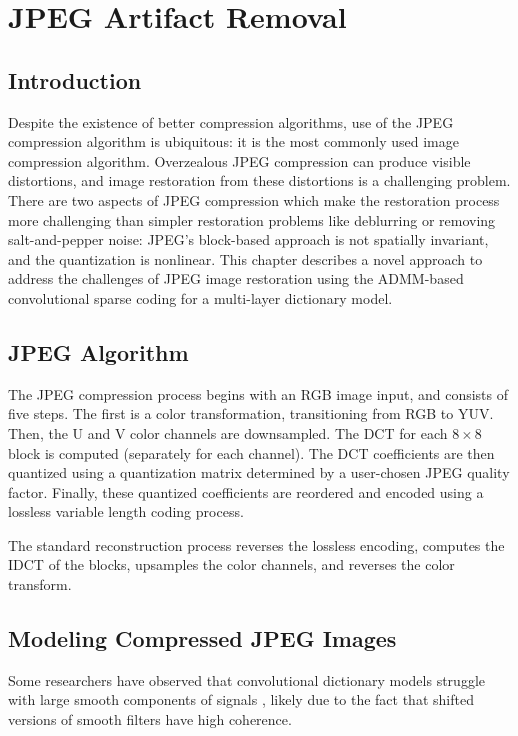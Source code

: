 \chapter{JPEG Artifact Removal}
\section{Introduction}
Despite the existence of better compression algorithms, use of the JPEG compression algorithm is ubiquitous: it is the most commonly used image compression algorithm.  Overzealous JPEG compression can produce visible distortions, and image restoration from these distortions is a challenging problem. There are two aspects of JPEG compression which make the restoration process more challenging than simpler restoration problems like deblurring or removing salt-and-pepper noise: JPEG's block-based approach is not spatially invariant, and the quantization is nonlinear. This chapter describes a novel approach to address the challenges of JPEG image restoration using the ADMM-based convolutional sparse coding for a multi-layer dictionary model.
\section{JPEG Algorithm}

The JPEG compression process begins with an RGB image input, and consists of five steps. The first is a color transformation, transitioning from RGB to YUV. Then, the U and V color channels are downsampled.  The DCT for each $8 \times 8$ block is computed (separately for each channel).  The DCT coefficients are then quantized using a quantization matrix determined by a user-chosen JPEG quality factor. Finally, these quantized coefficients are reordered and encoded using a lossless variable length coding process.

The standard reconstruction process reverses the lossless encoding, computes the IDCT of the blocks, upsamples the color channels, and reverses the color transform.
\section{Modeling Compressed JPEG Images}
Some researchers have observed that convolutional dictionary models struggle with large smooth components of signals \cite{garcia2018convolutional}, likely due to the fact that shifted versions of smooth filters have high coherence.

